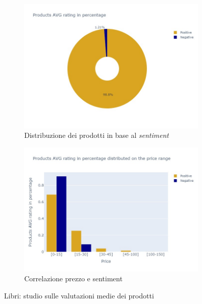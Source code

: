 				\begin{figure} [h]
					\centering
					\begin{subfigure}{0.48\textwidth}
						\includegraphics[width=\textwidth]{Figure/pie_books}
						\caption{Distribuzione dei prodotti in base al \textit{sentiment}}
						\label{fig:pie_books}
					\end{subfigure}
					\begin{subfigure}{0.48\textwidth}
						\includegraphics[width=\textwidth]{Figure/priceVSrating_books}
						\caption{Correlazione prezzo e sentiment}
						\label{fig:priceVSrating_books}
					\end{subfigure}
					\caption{Libri: studio sulle valutazioni medie dei prodotti}\label{fig:price_raiting_book}
				\end{figure}
			
